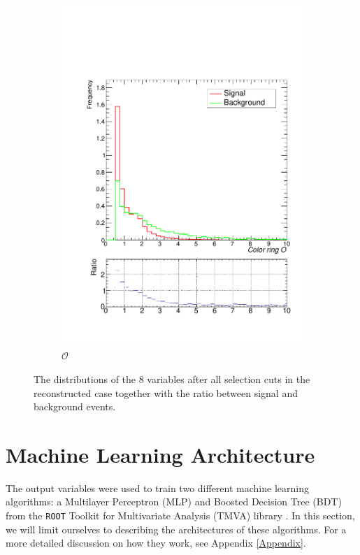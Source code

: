 \documentclass[10pt,a4paper]{book}
\def\code#1{\texttt{#1}}
\begin{document}
\begin{figure}
\begin{subfigure}{.5\textwidth}
\includegraphics[scale=0.25]{reco/cr}
\caption{$\mathcal{O}$}
\end{subfigure}
\caption{The distributions of the 8 variables after all selection cuts in the reconstructed case together with the ratio between signal and background events.}
\label{sgn/bkg reco}
\end{figure}


\section{Machine Learning Architecture}
The output variables were used to train two different machine learning algorithms: a Multilayer Perceptron (MLP) and Boosted Decision Tree (BDT) from the \code{ROOT} Toolkit for Multivariate Analysis (TMVA) library \cite{TMVA}. In this section, we will limit ourselves to describing the architectures of these algorithms. For a more detailed discussion on how they work, see Appendix \ref{Appendix}.
\end{document}
